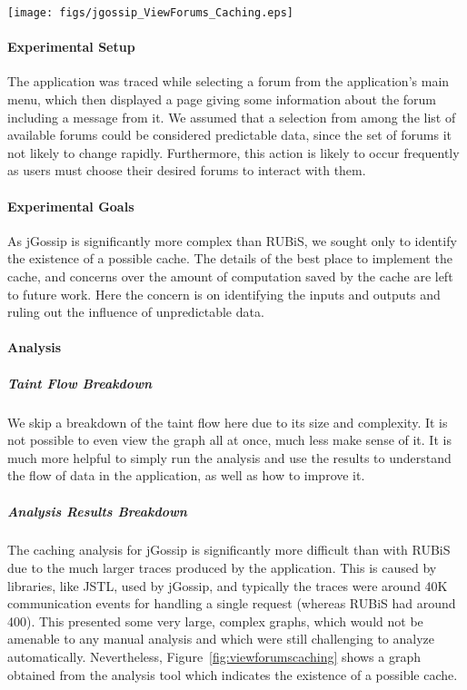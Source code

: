 \documentclass[msc,oneside]{ubcthesis}
\begin{document}
\begin{sidewaysfigure}
\centering
\scalebox{0.44}
{\texttt{[image: figs/jgossip\_ViewForums\_Caching.eps]}}
\caption{jGossip View Forums Caching Results} 
\label{fig:viewforumscaching}
\end{sidewaysfigure}

\paragraph{Experimental Setup}
\label{jgossip:caching}
The application was traced while selecting a forum from the application's main menu, which then displayed a page giving some information about the forum including a message from it. We assumed that a selection from among the list of available forums could be considered predictable data, since the set of forums it not likely to change rapidly. Furthermore, this action is likely to occur frequently as users must choose their desired forums to interact with them.

\paragraph{Experimental Goals}
As jGossip is significantly more complex than RUBiS, we sought only to identify the existence of a possible cache. The details of the best place to implement the cache, and concerns over the amount of computation saved by the cache are left to future work. Here the concern is on identifying the inputs and outputs and ruling out the influence of unpredictable data.

\paragraph{Analysis}
\subparagraph{Taint Flow Breakdown}
We skip a breakdown of the taint flow here due to its size and complexity. It is not possible to even view the graph all at once, much less make sense of it. It is much more helpful to simply run the analysis and use the results to understand the flow of data in the application, as well as how to improve it.

\subparagraph{Analysis Results Breakdown}
The caching analysis for jGossip is significantly more difficult than with RUBiS due to the much larger traces produced by the application. This is caused by libraries, like JSTL, used by jGossip, and typically the traces were around 40K communication events for handling a single request (whereas RUBiS had around 400). This presented some very large, complex graphs, which would not be amenable to any manual analysis and which were still challenging to analyze automatically. Nevertheless, Figure~\ref{fig:viewforumscaching} shows a graph obtained from the analysis tool which indicates the existence of a possible cache.\\
\end{document}
